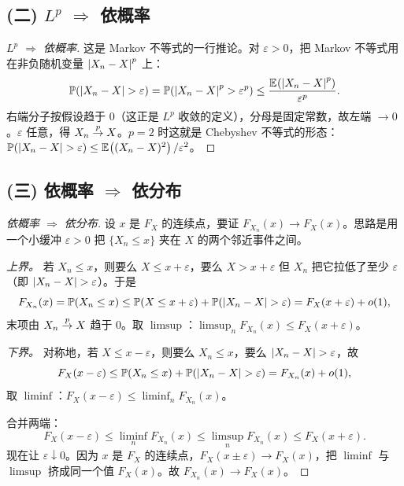 \subsection*{(二) $L^p$ $\Rightarrow$ 依概率}

\begin{proof}[$L^p$ $\Rightarrow$ 依概率]
这是 Markov 不等式的一行推论。对 $\varepsilon>0$，把 Markov 不等式用在非负随机变量 $\left|X_n-X\right|^p$ 上：
\[
    \Prob{\abs{X_n-X}>\varepsilon}
    =\Prob{\abs{X_n-X}^p>\varepsilon^p}
    \le\frac{\E{\abs{X_n-X}^p}}{\varepsilon^p}.
\]
右端分子按假设趋于 $0$（这正是 $L^p$ 收敛的定义），分母是固定常数，故左端 $\to 0$。$\varepsilon$ 任意，得 $X_n\overset{p}{\to} X$。$p=2$ 时这就是 Chebyshev 不等式的形态：$\Prob{\abs{X_n-X}>\varepsilon}\le \E{(X_n-X)^2}/\varepsilon^2$。
\end{proof}


\subsection*{(三) 依概率 $\Rightarrow$ 依分布}

\begin{proof}[依概率 $\Rightarrow$ 依分布]
设 $x$ 是 $F_X$ 的连续点，要证 $F_{X_n}(x)\to F_X(x)$。思路是用一个小缓冲 $\varepsilon>0$ 把 $\{X_n\le x\}$ 夹在 $X$ 的两个邻近事件之间。

\emph{上界。} 若 $X_n\le x$，则要么 $X\le x+\varepsilon$，要么 $X>x+\varepsilon$ 但 $X_n$ 把它拉低了至少 $\varepsilon$（即 $\abs{X_n-X}>\varepsilon$）。于是
\[
    F_{X_n}(x)=\Prob{X_n\le x}\le \Prob{X\le x+\varepsilon}+\Prob{\abs{X_n-X}>\varepsilon}
    =F_X(x+\varepsilon)+o(1),
\]
末项由 $X_n\overset{p}{\to} X$ 趋于 $0$。取 $\limsup$：$\limsup_n F_{X_n}(x)\le F_X(x+\varepsilon)$。

\emph{下界。} 对称地，若 $X\le x-\varepsilon$，则要么 $X_n\le x$，要么 $\abs{X_n-X}>\varepsilon$，故
\[
    F_X(x-\varepsilon)\le \Prob{X_n\le x}+\Prob{\abs{X_n-X}>\varepsilon}=F_{X_n}(x)+o(1),
\]
取 $\liminf$：$F_X(x-\varepsilon)\le\liminf_n F_{X_n}(x)$。

合并两端：
\[
    F_X(x-\varepsilon)\le\liminf_n F_{X_n}(x)\le\limsup_n F_{X_n}(x)\le F_X(x+\varepsilon).
\]
现在让 $\varepsilon\downarrow 0$。因为 $x$ 是 $F_X$ 的连续点，$F_X(x\pm\varepsilon)\to F_X(x)$，把 $\liminf$ 与 $\limsup$ 挤成同一个值 $F_X(x)$。故 $F_{X_n}(x)\to F_X(x)$。
\end{proof}

